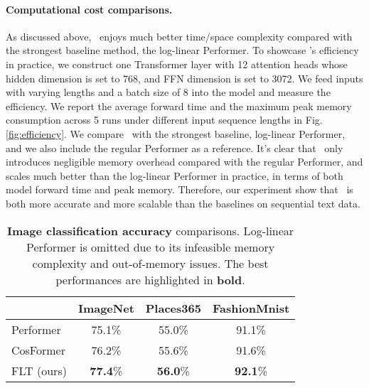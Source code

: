 \paragraph{Computational cost comparisons.} 
As discussed above, \FLT~enjoys much better time/space complexity compared with the strongest baseline method, the log-linear Performer. To showcase \FLT 's efficiency in practice, we construct one Transformer layer with 12 attention heads whose hidden dimension is set to 768, and FFN dimension is set to 3072. 
We feed inputs with varying lengths and a batch size of 8 into the model and measure the efficiency. We report the average forward time and the maximum peak memory consumption across 5 runs under different input sequence lengths in Fig. \ref{fig:efficiency}. 
We compare \FLT~with the strongest baseline, log-linear Performer, and we also include the regular Performer as a reference.
It's clear that \FLT~only introduces negligible memory overhead compared with the regular Performer, and scales much better than the log-linear Performer in practice, in terms of both model forward time and peak memory. Therefore, our experiment show that \FLT~is both more accurate and more scalable than the baselines on sequential text data.

\begin{table}[t]
  \centering
  \caption{\textbf{Image classification accuracy} comparisons. Log-linear Performer is omitted due to its infeasible memory complexity and out-of-memory issues. The best performances are highlighted in \textbf{bold}.}
  \label{tab:image}
  \begin{tabular}{@{}lccc@{}}
    \toprule
    & ImageNet & Places365 & FashionMnist \\
    \midrule
    Performer & 75.1\% & 55.0\% & 91.1\% \\
    CosFormer & 76.2\% & 55.6\% & 91.6\% \\
    FLT (ours) & \textbf{77.4}\% & \textbf{56.0}\% & \textbf{92.1}\% \\
    \bottomrule
  \end{tabular}
\end{table}

